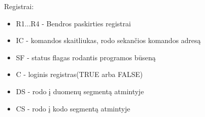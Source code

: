 \documentclass[oneside]{VUMIFPSkursinis}
\begin{document}
Registrai:
\begin{itemize}
	\item{R1...R4 - Bendros paskirties registrai}
	\item{IC - komandos skaitliukas, rodo sekančios komandos adresą }
	\item{SF - status flagas rodantis programos būseną}
	\item{C - loginis registras(TRUE arba FALSE)}
	\item{DS - rodo į duomenų segmentą atmintyje}
	\item{CS - rodo į kodo segmentą atmintyje}
\end{itemize}

	
	
\end{document}
